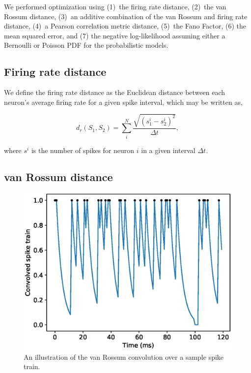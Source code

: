 \documentclass[mphil,deptreport,ianc]{infthesis} %
\begin{document}
We performed optimization using (1)~the firing rate distance, (2)~the van Rossum distance, (3)~an additive combination of the van Rossum and firing rate distance, (4)~a Pearson correlation metric distance, (5)~the Fano Factor, (6) the mean squared error, and (7) the negative log-likelihood assuming either a Bernoulli or Poisson PDF for the probabilistic models.

\subsection{Firing rate distance}

We define the firing rate distance as the Euclidean distance between each neuron's average firing rate for a given spike interval, which may be written as,

\begin{equation}
    d_r(S_1, S_2) = \sum_i^N{\frac{\sqrt{(s_1^i - s_2^i)^2}}{\Delta t}},
\end{equation}

where $s^i$ is the number of spikes for neuron $i$ in a given interval $\Delta t$.

\subsection{van Rossum distance}

\begin{figure}
    \centering
    \vskip -0.1in
    \includegraphics[width=0.9\columnwidth]{figures/samples/neur_vr_conv_sample.eps}
    \vskip -0.1in
    \caption{An illustration of the van Rossum convolution over a sample spike train.}
    \label{fig:vrd_conv_sample}
    \vskip -0.2in
\end{figure}
\end{document}
